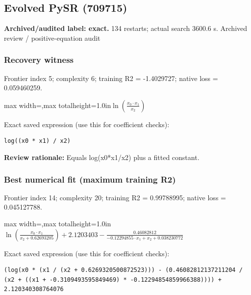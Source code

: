 \documentclass[10pt,letterpaper,landscape]{article}
\begin{document}
\begin{minipage}[t]{0.485\textwidth}
\subsection*{Evolved PySR (709715)}
\textbf{Archived/audited label: exact.} 134 restarts; actual search 3600.6 s.
{\small Archived review / positive-equation audit}
\subsubsection*{Recovery witness}
Frontier index 5; complexity 6; training R2 = -1.4029727; native loss = 0.059460259.
\begin{center}\begin{adjustbox}{max width=\linewidth,max totalheight=1.0in}$\displaystyle \ln{\left(\frac{x_{0} \cdot x_{1}}{x_{2}} \right)}$\end{adjustbox}\end{center}
{\scriptsize Exact saved expression (use this for coefficient checks):}
\begin{lstlisting}
log((x0 * x1) / x2)
\end{lstlisting}
{\small\textbf{Review rationale:} Equals log(x0*x1/x2) plus a fitted constant.}
\subsubsection*{Best numerical fit (maximum training R2)}
Frontier index 14; complexity 20; training R2 = 0.99788995; native loss = 0.045127788.
\begin{center}\begin{adjustbox}{max width=\linewidth,max totalheight=1.0in}$\displaystyle \ln{\left(\frac{x_{0} \cdot x_{1}}{x_{2} + 0.62693205} \right)} + 2.1203403 - \frac{0.46082812}{- 0.12294855 \cdot x_{1} + x_{2} + 0.038230772}$\end{adjustbox}\end{center}
{\scriptsize Exact saved expression (use this for coefficient checks):}
\begin{lstlisting}
(log(x0 * (x1 / (x2 + 0.6269320500872523))) - (0.46082812137211204 / (x2 + ((x1 + -0.3109493595849469) * -0.12294854859966388)))) + 2.120340308764076
\end{lstlisting}
\end{minipage}
\clearpage{}\label{ideal_gas-10009}
\end{document}
